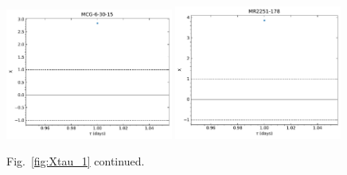 \begin{figure}
\begin{center}
{  \includegraphics[width=0.49\textwidth]{Figs/Chapter5/X_tau/X_tau_MCG-6-30-15.pdf} \hfill 
  \includegraphics[width=0.49\textwidth]{Figs/Chapter5/X_tau/X_tau_MR2251-178.pdf} \hfill \\
  \caption{Fig.~\ref{fig:Xtau_1} continued.}
    \label{fig:Xtau_2}
  }
\end{center}
\end{figure}

